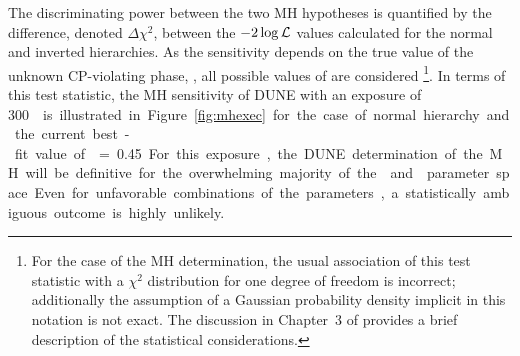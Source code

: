 

%

The discriminating power between the two MH hypotheses is quantified
by the difference, denoted $\Delta \chi^2$, between the
$-2\log{\cal L}$ values calculated for the normal and inverted
hierarchies. As the sensitivity depends on the true value of the unknown
CP-violating phase, \deltacp, all possible values of \deltacp are
considered  \footnote{For the case of the MH determination, the usual
  association of this test statistic with a $\chi^2$ distribution for
  one degree of freedom is incorrect; additionally the assumption of a
  Gaussian probability density %
  implicit in this notation is not exact.  The discussion in Chapter~3
  of \volphys provides a brief description of the statistical
  considerations.}.  In terms of this test statistic, the MH
sensitivity of DUNE with an exposure of \SI{300}\ktMWyr{} is
illustrated in Figure~\ref{fig:mhexec} for the case of normal
hierarchy and the current best-fit value of  = \SI{0.45}. 
For this exposure, the DUNE determination of the MH will be definitive for
the overwhelming majority of the  \deltacp and  parameter space.
Even for unfavorable combinations of the parameters, a statistically
ambiguous outcome is highly unlikely.  

